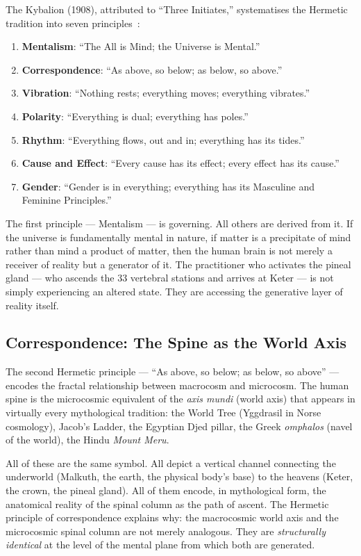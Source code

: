 \documentclass[12pt, a4paper]{article}
\begin{document}
The Kybalion (1908), attributed to ``Three Initiates,'' systematises the
Hermetic tradition into seven principles~\autocite{kybalion1908}:

\begin{enumerate}
  \item \textbf{Mentalism}: ``The All is Mind; the Universe is Mental.''
  \item \textbf{Correspondence}: ``As above, so below; as below, so above.''
  \item \textbf{Vibration}: ``Nothing rests; everything moves; everything vibrates.''
  \item \textbf{Polarity}: ``Everything is dual; everything has poles.''
  \item \textbf{Rhythm}: ``Everything flows, out and in; everything has its tides.''
  \item \textbf{Cause and Effect}: ``Every cause has its effect; every effect has its cause.''
  \item \textbf{Gender}: ``Gender is in everything; everything has its Masculine and Feminine Principles.''
\end{enumerate}

The first principle — Mentalism — is governing. All others are derived from
it. If the universe is fundamentally mental in nature, if matter is a
precipitate of mind rather than mind a product of matter, then the human
brain is not merely a receiver of reality but a generator of it. The
practitioner who activates the pineal gland — who ascends the 33 vertebral
stations and arrives at Keter — is not simply experiencing an altered state.
They are accessing the generative layer of reality itself.

\subsection{Correspondence: The Spine as the World Axis}

The second Hermetic principle — ``As above, so below; as below, so above'' —
encodes the fractal relationship between macrocosm and microcosm. The human
spine is the microcosmic equivalent of the \emph{axis mundi} (world axis)
that appears in virtually every mythological tradition: the World Tree
(Yggdrasil in Norse cosmology), Jacob's Ladder, the Egyptian Djed pillar, the
Greek \emph{omphalos} (navel of the world), the Hindu \emph{Mount Meru}.

All of these are the same symbol. All depict a vertical channel connecting
the underworld (Malkuth, the earth, the physical body's base) to the heavens
(Keter, the crown, the pineal gland). All of them encode, in mythological
form, the anatomical reality of the spinal column as the path of ascent. The
Hermetic principle of correspondence explains why: the macrocosmic world axis
and the microcosmic spinal column are not merely analogous. They are
\emph{structurally identical} at the level of the mental plane from which
both are generated.
\end{document}

